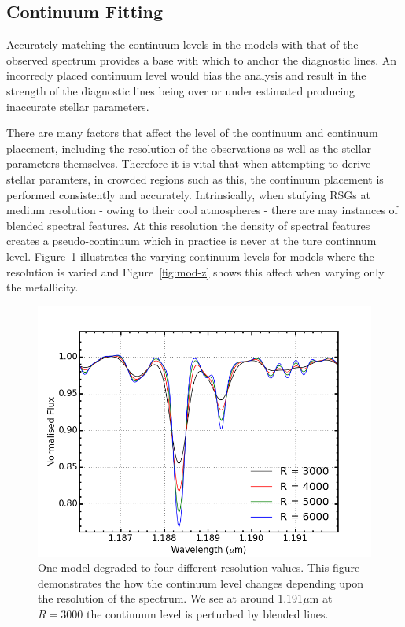 \documentclass[12pt]{article}
\begin{document}
\subsection{Continuum Fitting} %
\label{sub:continuum_fitting}

Accurately matching the continuum levels in the models with that of the observed
spectrum provides a base with which to anchor the diagnostic lines.
An incorrecly placed continuum level would bias the analysis and result in the
strength of the diagnostic lines being over or under estimated producing inaccurate stellar parameters.

There are many factors that affect the level of the continuum and continuum placement,
including the resolution of the observations as well as the stellar parameters themselves.
Therefore it is vital that when attempting to derive stellar paramters,
in crowded regions such as this, the continuum placement is performed
consistently and accurately.
Intrinsically, when stufying RSGs at medium resolution - owing  to their cool atmospheres -
there are may instances of blended spectral features.
At this resolution the density of spectral features creates a pseudo-continuum which in practice is never at the ture continnum level.
Figure~\ref{fig:mod-res} illustrates the varying continuum levels for models where the resolution is varied and
Figure~\ref{fig:mod-z} shows this affect when varying only the metallicity.

\begin{figure}
 \centering
\includegraphics[width=\textwidth]{Resolution}
\caption{
One model degraded to four different resolution values.
This figure demonstrates the how the continuum level changes depending upon
the resolution of the spectrum.
We see at around 1.191$\mu$m at $R=3000$ the continuum level is perturbed by blended lines.
\label{fig:mod-res}
         }
\end{figure}
\end{document}
